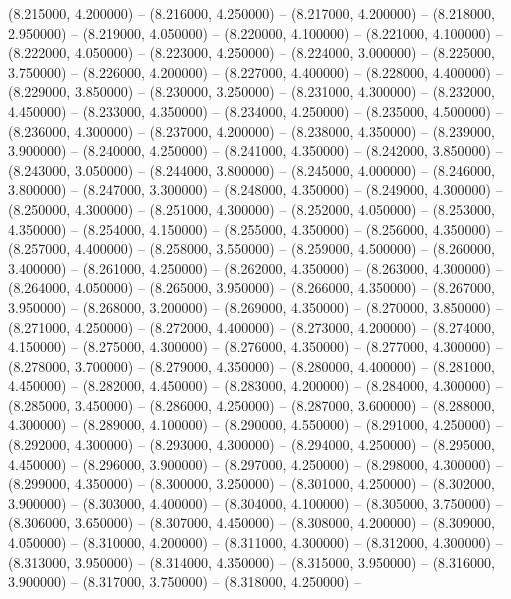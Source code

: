(8.215000, 4.200000) -- 
(8.216000, 4.250000) -- 
(8.217000, 4.200000) -- 
(8.218000, 2.950000) -- 
(8.219000, 4.050000) -- 
(8.220000, 4.100000) -- 
(8.221000, 4.100000) -- 
(8.222000, 4.050000) -- 
(8.223000, 4.250000) -- 
(8.224000, 3.000000) -- 
(8.225000, 3.750000) -- 
(8.226000, 4.200000) -- 
(8.227000, 4.400000) -- 
(8.228000, 4.400000) -- 
(8.229000, 3.850000) -- 
(8.230000, 3.250000) -- 
(8.231000, 4.300000) -- 
(8.232000, 4.450000) -- 
(8.233000, 4.350000) -- 
(8.234000, 4.250000) -- 
(8.235000, 4.500000) -- 
(8.236000, 4.300000) -- 
(8.237000, 4.200000) -- 
(8.238000, 4.350000) -- 
(8.239000, 3.900000) -- 
(8.240000, 4.250000) -- 
(8.241000, 4.350000) -- 
(8.242000, 3.850000) -- 
(8.243000, 3.050000) -- 
(8.244000, 3.800000) -- 
(8.245000, 4.000000) -- 
(8.246000, 3.800000) -- 
(8.247000, 3.300000) -- 
(8.248000, 4.350000) -- 
(8.249000, 4.300000) -- 
(8.250000, 4.300000) -- 
(8.251000, 4.300000) -- 
(8.252000, 4.050000) -- 
(8.253000, 4.350000) -- 
(8.254000, 4.150000) -- 
(8.255000, 4.350000) -- 
(8.256000, 4.350000) -- 
(8.257000, 4.400000) -- 
(8.258000, 3.550000) -- 
(8.259000, 4.500000) -- 
(8.260000, 3.400000) -- 
(8.261000, 4.250000) -- 
(8.262000, 4.350000) -- 
(8.263000, 4.300000) -- 
(8.264000, 4.050000) -- 
(8.265000, 3.950000) -- 
(8.266000, 4.350000) -- 
(8.267000, 3.950000) -- 
(8.268000, 3.200000) -- 
(8.269000, 4.350000) -- 
(8.270000, 3.850000) -- 
(8.271000, 4.250000) -- 
(8.272000, 4.400000) -- 
(8.273000, 4.200000) -- 
(8.274000, 4.150000) -- 
(8.275000, 4.300000) -- 
(8.276000, 4.350000) -- 
(8.277000, 4.300000) -- 
(8.278000, 3.700000) -- 
(8.279000, 4.350000) -- 
(8.280000, 4.400000) -- 
(8.281000, 4.450000) -- 
(8.282000, 4.450000) -- 
(8.283000, 4.200000) -- 
(8.284000, 4.300000) -- 
(8.285000, 3.450000) -- 
(8.286000, 4.250000) -- 
(8.287000, 3.600000) -- 
(8.288000, 4.300000) -- 
(8.289000, 4.100000) -- 
(8.290000, 4.550000) -- 
(8.291000, 4.250000) -- 
(8.292000, 4.300000) -- 
(8.293000, 4.300000) -- 
(8.294000, 4.250000) -- 
(8.295000, 4.450000) -- 
(8.296000, 3.900000) -- 
(8.297000, 4.250000) -- 
(8.298000, 4.300000) -- 
(8.299000, 4.350000) -- 
(8.300000, 3.250000) -- 
(8.301000, 4.250000) -- 
(8.302000, 3.900000) -- 
(8.303000, 4.400000) -- 
(8.304000, 4.100000) -- 
(8.305000, 3.750000) -- 
(8.306000, 3.650000) -- 
(8.307000, 4.450000) -- 
(8.308000, 4.200000) -- 
(8.309000, 4.050000) -- 
(8.310000, 4.200000) -- 
(8.311000, 4.300000) -- 
(8.312000, 4.300000) -- 
(8.313000, 3.950000) -- 
(8.314000, 4.350000) -- 
(8.315000, 3.950000) -- 
(8.316000, 3.900000) -- 
(8.317000, 3.750000) -- 
(8.318000, 4.250000) -- 
